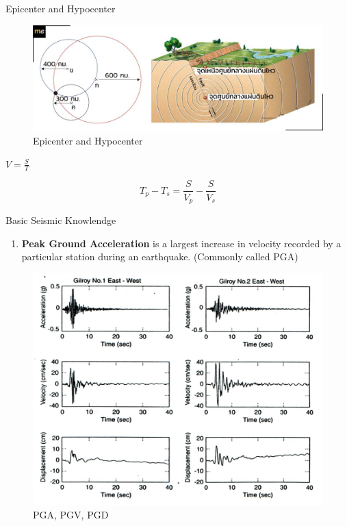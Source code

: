 \documentclass{beamer}
\newcounter{saveenumi}
\newcommand{\seti}{\setcounter{saveenumi}{\value{enumi}}}
\newcommand{\conti}{\setcounter{enumi}{\value{saveenumi}}}
\begin{document}
	\begin{frame}[t]{Epicenter and Hypocenter}
		\begin{figure}
			\centering
			\includegraphics[scale=0.8]{velocity.jpg}
			\caption{Epicenter and Hypocenter}
		\end{figure}
	$V = \frac{S}{T}$
	
	$$T_p - T_s = \frac{S}{V_p} - \frac{S}{V_s}$$
	\end{frame}
	
	
	\begin{frame}[t]{Basic Seismic Knowlendge}
		\begin{enumerate}
			\conti
			\item \textbf{Peak Ground Acceleration} is a largest increase in velocity recorded by a particular station during 
			an earthquake. (Commonly called PGA) 
			\seti
		\end{enumerate}
	
		\begin{figure}
			\centering
			\includegraphics[scale=0.35]{pga.jpg}
			\caption{PGA, PGV, PGD}
		\end{figure}
	\end{frame}
	
\end{document}
